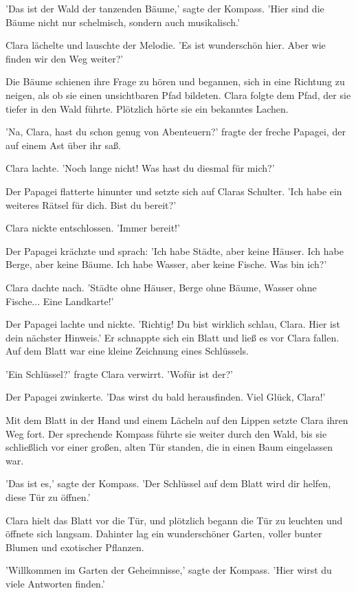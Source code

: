 \documentclass[12pt]{article}
\begin{document}
'Das ist der Wald der tanzenden Bäume,' sagte der Kompass. 'Hier sind die Bäume nicht nur schelmisch, sondern auch musikalisch.'

Clara lächelte und lauschte der Melodie. 'Es ist wunderschön hier. Aber wie finden wir den Weg weiter?'

Die Bäume schienen ihre Frage zu hören und begannen, sich in eine Richtung zu neigen, als ob sie einen unsichtbaren Pfad bildeten. Clara folgte dem Pfad, der sie tiefer in den Wald führte. Plötzlich hörte sie ein bekanntes Lachen.

'Na, Clara, hast du schon genug von Abenteuern?' fragte der freche Papagei, der auf einem Ast über ihr saß.

Clara lachte. 'Noch lange nicht! Was hast du diesmal für mich?'

Der Papagei flatterte hinunter und setzte sich auf Claras Schulter. 'Ich habe ein weiteres Rätsel für dich. Bist du bereit?'

Clara nickte entschlossen. 'Immer bereit!'

Der Papagei krächzte und sprach: 'Ich habe Städte, aber keine Häuser. Ich habe Berge, aber keine Bäume. Ich habe Wasser, aber keine Fische. Was bin ich?'

Clara dachte nach. 'Städte ohne Häuser, Berge ohne Bäume, Wasser ohne Fische... Eine Landkarte!'

Der Papagei lachte und nickte. 'Richtig! Du bist wirklich schlau, Clara. Hier ist dein nächster Hinweis.' Er schnappte sich ein Blatt und ließ es vor Clara fallen. Auf dem Blatt war eine kleine Zeichnung eines Schlüssels.

'Ein Schlüssel?' fragte Clara verwirrt. 'Wofür ist der?'

Der Papagei zwinkerte. 'Das wirst du bald herausfinden. Viel Glück, Clara!'

Mit dem Blatt in der Hand und einem Lächeln auf den Lippen setzte Clara ihren Weg fort. Der sprechende Kompass führte sie weiter durch den Wald, bis sie schließlich vor einer großen, alten Tür standen, die in einen Baum eingelassen war.

'Das ist es,' sagte der Kompass. 'Der Schlüssel auf dem Blatt wird dir helfen, diese Tür zu öffnen.'

Clara hielt das Blatt vor die Tür, und plötzlich begann die Tür zu leuchten und öffnete sich langsam. Dahinter lag ein wunderschöner Garten, voller bunter Blumen und exotischer Pflanzen.

'Willkommen im Garten der Geheimnisse,' sagte der Kompass. 'Hier wirst du viele Antworten finden.'
\end{document}

